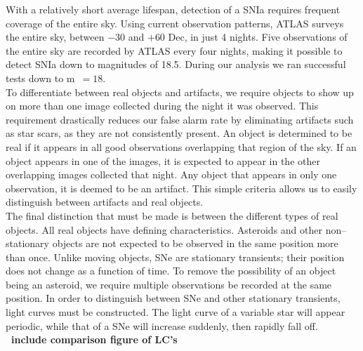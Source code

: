 \documentclass[aps,prb,twocolumn,superscriptaddress]{revtex4-1}
\begin{document}
\indent With a relatively short average lifespan, detection of a SNIa requires 
frequent coverage of the entire sky. Using current observation patterns,
ATLAS surveys the entire sky, between $-30$ and $+60$ Dec, in just 4 nights. 
Five observations of the entire sky are recorded by ATLAS every four nights, 
making it possible to detect SNIa down to magnitudes of 18.5.  During our analysis 
we ran successful tests down to m~$=18$.\\
\indent To differentiate between real objects 
and artifacts, we require %
objects to show up on 
more than one image collected during the night it was observed.  
This requirement drastically reduces our false alarm rate by 
eliminating artifacts such as star scars, as they 
are not consistently present.  
An object is determined to be real if it appears in all good 
observations overlapping that region of the sky.  
If an object appears in one of the images, it is expected to appear 
in the other overlapping images collected that night.  %
Any object that appears in only one observation, it is deemed to be 
an artifact.  This simple criteria allows us to easily 
distinguish between artifacts and real objects.\\
\indent The final distinction that must be made is between the different 
types of real objects.  All real objects have defining characteristics.  
Asteroids and other non--stationary objects are not expected to be observed 
in the same position more than once.  Unlike moving objects, SNe are 
stationary transients; their position does not change as a function of time.  
%
%
To remove the possibility of an object being an asteroid, we require multiple 
observations be recorded at the same position.  In order to distinguish between 
SNe and other stationary transients, light curves must be constructed.  The light 
curve of a variable star will appear periodic, while that of a SNe will increase 
suddenly, then rapidly fall off.  
{\bf ~\\~include comparison figure of LC's}
\end{document}
